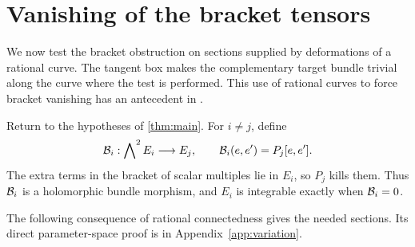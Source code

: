 \section{Vanishing of the bracket tensors}\label{sec:vanishing}

We now test the bracket obstruction on sections supplied by deformations
of a rational curve. The tangent box makes the complementary target
bundle trivial along the curve where the test is performed. This use of
rational curves to force bracket vanishing has an antecedent in
\cite[Section~2.B and Lemma~3.18]{Hor07}.

Return to the hypotheses of \cref{thm:main}. For \(i\ne j\), define
\[
\mathcal B_i:\bigwedge\nolimits^2E_i\longrightarrow E_j,\qquad
\mathcal B_i(e,e')=P_j[e,e'].
\]
The extra terms in the bracket of scalar multiples lie in \(E_i\),
so \(P_j\) kills them. Thus \(\mathcal B_i\) is a holomorphic bundle
morphism, and \(E_i\) is integrable exactly when \(\mathcal B_i=0\).

The following consequence of rational connectedness gives the needed
sections. Its direct parameter-space proof is in
Appendix~\ref{app:variation}.


